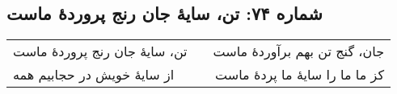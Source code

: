 \begin{center}
\section*{شماره ۷۴: تن، سایۀ جان رنج پروردۀ ماست}
\label{sec:074}
\begin{longtable}{l p{0.5cm} r}
تن، سایهٔ جان رنج پروردهٔ ماست
&&
جان، گنج تن بهم برآوردهٔ ماست
\\
از سایهٔ خویش در حجابیم همه
&&
کز ما ما را سایهٔ ما پردهٔ ماست
\\
\end{longtable}
\end{center}
